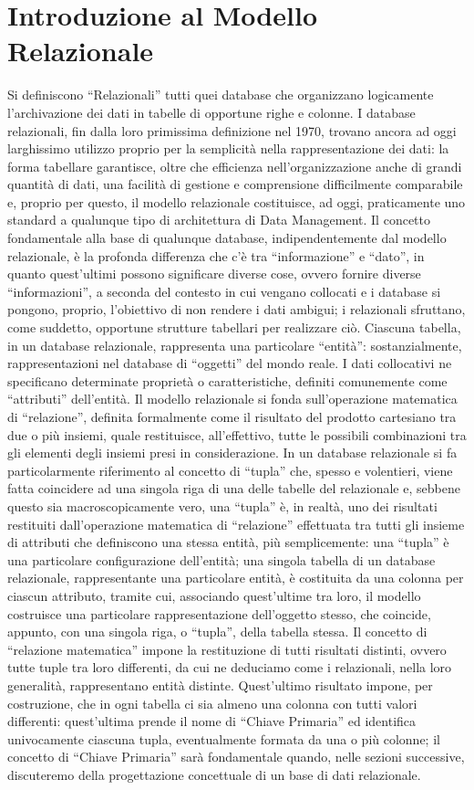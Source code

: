 \documentclass[a4paper,12pt]{report}
\begin{document}
\section{Introduzione al Modello Relazionale}
Si definiscono “Relazionali” tutti quei database che organizzano logicamente l’archivazione dei dati in tabelle di opportune righe e colonne. I database relazionali, fin dalla loro primissima definizione nel 1970, trovano ancora ad oggi larghissimo utilizzo proprio per la semplicità nella rappresentazione dei dati: la forma tabellare garantisce, oltre che efficienza nell’organizzazione anche di grandi quantità di dati, una facilità di gestione e comprensione difficilmente comparabile e, proprio per questo, il modello relazionale costituisce, ad oggi, praticamente uno standard a qualunque tipo di architettura di Data Management.
Il concetto fondamentale alla base di qualunque database, indipendentemente dal modello relazionale, è la profonda differenza che c’è tra “informazione” e “dato”, in quanto quest’ultimi possono significare diverse cose, ovvero fornire diverse “informazioni”, a seconda del contesto in cui vengano collocati e i database si pongono, proprio, l’obiettivo di non rendere i dati ambigui; i relazionali sfruttano, come suddetto, opportune strutture tabellari per realizzare ciò. 
Ciascuna tabella, in un database relazionale, rappresenta una particolare “entità”: sostanzialmente, rappresentazioni nel database di “oggetti” del mondo reale. I dati collocativi ne specificano determinate proprietà o caratteristiche, definiti comunemente come “attributi” dell’entità. Il modello relazionale si fonda sull’operazione matematica di “relazione”, definita formalmente come il risultato del prodotto cartesiano tra due o più insiemi, quale restituisce, all’effettivo, tutte le possibili combinazioni tra gli elementi degli insiemi presi in considerazione. In un database relazionale si fa particolarmente riferimento al concetto di “tupla” che, spesso e volentieri, viene fatta coincidere ad una singola riga di una delle tabelle del relazionale e, sebbene questo sia macroscopicamente vero, una “tupla” è, in realtà, uno dei risultati restituiti dall’operazione matematica di “relazione” effettuata tra tutti gli insieme di attributi che definiscono una stessa entità, più semplicemente: una “tupla” è una particolare configurazione dell’entità; una singola tabella di un database relazionale, rappresentante una particolare entità, è costituita da una colonna per ciascun attributo, tramite cui, associando quest’ultime tra loro, il modello costruisce una particolare rappresentazione dell’oggetto stesso, che coincide, appunto, con una singola riga, o “tupla”, della tabella stessa. Il concetto di “relazione matematica” impone la restituzione di tutti risultati distinti, ovvero tutte tuple tra loro differenti, da cui ne deduciamo come i relazionali, nella loro generalità, rappresentano entità distinte. Quest’ultimo risultato impone, per costruzione, che in ogni tabella ci sia almeno una colonna con tutti valori differenti: quest’ultima prende il nome di “Chiave Primaria” ed identifica univocamente ciascuna tupla, eventualmente formata da una o più colonne; il concetto di “Chiave Primaria” sarà fondamentale quando, nelle sezioni successive, discuteremo della progettazione concettuale di un base di dati relazionale. 
\end{document}
